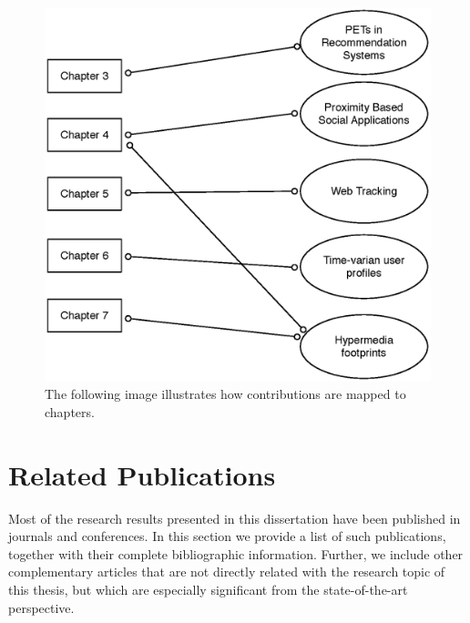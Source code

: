 \begin{figure}
\includegraphics[width=\textwidth]{figures/thesis-map.eps}
\caption[Advertising services feedback loop]{The following image illustrates how contributions are mapped to chapters.}
\label{fig:contributions}
\end{figure}

\section{Related Publications}

Most of the research results presented in this dissertation have been published in journals and conferences. In this section we provide a list of such publications, together with their complete bibliographic information. Further, we include other complementary articles that are not directly related with the research topic of this thesis, but which are especially
significant from the state-of-the-art perspective.

